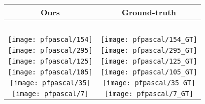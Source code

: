 \documentclass{article}
\begin{document}
\begin{figure}[tbp]
  \centering
  \begingroup
  \renewcommand{\arraystretch}{0.5}
  \begin{tabular}{@{\hskip 1pt}c@{\hskip 6pt}|@{\hskip 6pt}c@{\hskip 1pt}}
    Ours & Ground-truth \\ \hline
    ~ & ~ \\
\texttt{[image: pfpascal/154]}  &
\texttt{[image: pfpascal/154\_GT]} \\
\texttt{[image: pfpascal/295]}  &
\texttt{[image: pfpascal/295\_GT]} \\
\texttt{[image: pfpascal/125]}  &
\texttt{[image: pfpascal/125\_GT]} \\
\texttt{[image: pfpascal/105]}  &
\texttt{[image: pfpascal/105\_GT]} \\
\texttt{[image: pfpascal/35]}  &
\texttt{[image: pfpascal/35\_GT]} \\
\texttt{[image: pfpascal/7]}  &
\texttt{[image: pfpascal/7\_GT]} \\



\end{tabular}
\end{figure}
\end{document}
